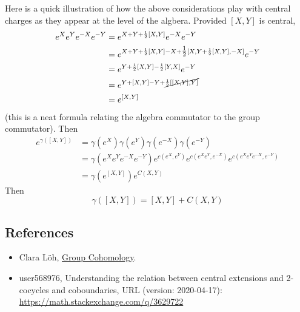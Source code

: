 \documentclass{report}
\begin{document}
Here is a quick illustration of how the above considerations play with 
central charges as they appear at the level of the algbera. Provided $ [X,Y] $ is central, 
\begin{align*}
	e^X e^Y e^{-X} e^{-Y}
		&= e^{X + Y + \frac{1}{2}[X,Y]} e^{-X} e^{-Y}\\
		&= e^{X + Y  + \frac{1}{2} [X,Y] - X + \tfrac{1}{2} [X, Y + \frac{1}{2}[X,Y], -X]} e^{-Y}\\
		&= e^{Y + \frac{1}{2}[X,Y] - \frac{1}{2}[Y,X]} e^{-Y}\\ 
		&= e^{Y + [X, Y] -Y + \cancel{ \frac{1}{2} [[X,Y], Y]}}\\ 
		&= e^{[X,Y]}
\end{align*}
(this is a neat formula relating the algebra commutator to the group commutator). 
Then
\begin{align*}
	e^{\gamma([X,Y])} &= \gamma(e^{X}) \gamma(e^Y)\gamma(e^{-X}) \gamma(e^{-Y})\\
		&= \gamma(e^X e^Y e^{-X} e^{-Y})
			e^{c(e^X, e^Y)}
			e^{c(e^X e^Y, e^{-X})}
			e^{c(e^X e^Y e^{-X}, e^{-Y})}\\
		&= \gamma(e^{[X,Y]}) e^{C(X,Y)}
\end{align*}
Then 
\begin{equation*}
	\gamma([X,Y]) = [X,Y] + C(X,Y)
\end{equation*}

\subsection*{References} 
\begin{itemize}[nosep]
\item Clara L\"oh, \href{https://loeh.app.uni-regensburg.de/teaching/grouphom_ss19/lecture_notes.pdf}{Group Cohomology}.
\item user568976, Understanding the relation between central extensions and
	2-cocycles and coboundaries, URL (version: 2020-04-17):
	\url{https://math.stackexchange.com/q/3629722}
\end{itemize}


\end{document}
